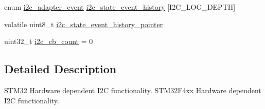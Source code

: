 \begin{DoxyCompactItemize}
\item 
enum \hyperlink{group___p_i_o_s___i2_c_ga2a8f77797f5dbd873514e92d3d043649}{i2c\-\_\-adapter\-\_\-event} \hyperlink{group___p_i_o_s___i2_c_gad2fddef6926d27512901cbe84b7b99bd}{i2c\-\_\-state\-\_\-event\-\_\-history} \mbox{[}\-I2\-C\-\_\-\-L\-O\-G\-\_\-\-D\-E\-P\-T\-H\mbox{]}
\item 
volatile uint8\-\_\-t \hyperlink{group___p_i_o_s___i2_c_gabdb9d9357371d1ece20779da0d69d27b}{i2c\-\_\-state\-\_\-event\-\_\-history\-\_\-pointer}
\item 
uint32\-\_\-t \hyperlink{group___p_i_o_s___i2_c_gadd232b764b6676824e5a173a7b78f9fd}{i2c\-\_\-cb\-\_\-count} = 0
\end{DoxyCompactItemize}


\subsection{\-Detailed \-Description}
\-S\-T\-M32 \-Hardware dependent \-I2\-C functionality. \-S\-T\-M32\-F4xx \-Hardware dependent \-I2\-C functionality. 

